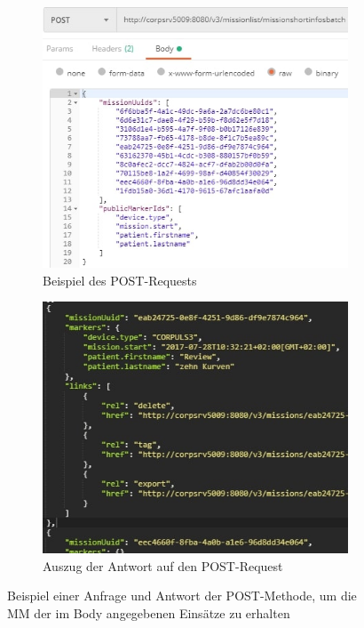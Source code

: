 \begin{figure}[ht]
\begin{subfigure}{.5\linewidth}
  \centering
  \includegraphics[width=.95\linewidth]{img/exRequestW}  
  \caption{Beispiel des POST-Requests}
  \label{fig:request}
\end{subfigure}
\begin{subfigure}{.5\linewidth}
  \centering
  \includegraphics[width=.95\linewidth]{img/exResponse}  
  \caption{Auszug der Antwort auf den POST-Request}
  \label{fig:response}
\end{subfigure}
\caption[Beispiel einer Anfrage und Antwort der POST-Methode]{Beispiel einer Anfrage und Antwort der POST-Methode, um die \gls{MM} der im Body angegebenen Einsätze zu erhalten}
\label{fig:fig}
\end{figure}

